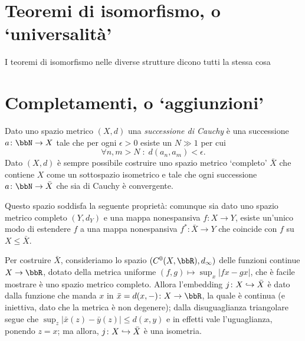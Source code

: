 \section*{Teoremi di isomorfismo, o `universalità'}
I teoremi di isomorfismo nelle diverse strutture dicono tutti la stessa cosa
\section*{Completamenti, o `aggiunzioni'}
Dato uno spazio metrico \((X,d)\) una \emph{successione di Cauchy} è una successione \(a \colon \bbN \to X\) tale che per ogni \(\epsilon>0\) esiste un \(N\gg 1\) per cui
\[\forall n,m> N\; : \; d(a_n,a_m) < \epsilon.\]
Dato \((X,d)\) è sempre possibile costruire uno spazio metrico `completo' \(\bar X\) che contiene \(X\) come un sottospazio isometrico e tale che ogni successione \(a \colon \bbN \to \bar X\) che sia di Cauchy è convergente.

Questo spazio soddisfa la seguente proprietà: comunque sia dato uno spazio metrico completo \((Y,d_Y)\) e una mappa nonespansiva \(f \colon X\to Y\), esiste un'unico modo di estendere \(f\) a una mappa nonespansiva \(f^* \colon \bar X \to Y\) che coincide con \(f\) su \(X\le \bar X\).

Per costruire \(\bar X\), consideriamo lo spazio \((C^0(X,\bbR),d_\infty)\) delle funzioni continue \(X\to\bbR\), dotato della metrica uniforme \((f,g)\mapsto \sup_x |fx-gx|\), che è facile mostrare è uno spazio metrico completo. Allora l'embedding \(j \colon X\hookrightarrow \bar X\) è dato dalla funzione che manda \(x\) in \(\bar x = d(x,-) \colon X\to \bbR\), la quale è continua (e iniettiva, dato che la metrica è non degenere); dalla disuguaglianza triangolare segue che \(\sup_z|\bar{x}(z)-\bar{y}(z)|\le d(x,y)\) e in effetti vale l'uguaglianza, ponendo \(z=x\); ma allora, \(j \colon X\hookrightarrow \bar X\) è una isometria.


